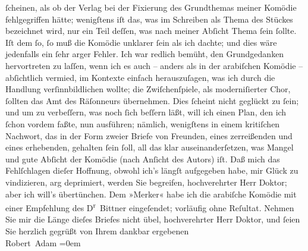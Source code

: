 \begin{ledgroupsized}[t]{13cm}
                    ſcheinen, als ob der Verlag bei der Fixierung des Grundthemas meiner Komödie
                    fehlgegriffen hätte; wenigſtens iſt das, was im Schreiben als Thema des Stückes
                    bezeichnet wird, nur ein Teil deſſen, was nach meiner Abſicht Thema ſein ſollte.
                    Iſt dem ſo, ſo muß die Komödie unklarer ſein als ich dachte; und dies wäre
                    jedenfalls ein ſehr arger Fehler. Ich war redlich bemüht, den Grundgedanken
                    hervortreten zu laſſen, {\pb}wenn ich es auch –
                    anders als in der arabiſchen
                        Komödie – abſichtlich vermied, im Kontexte einfach herauszuſagen, was
                    ich durch die Handlung verſinnbildlichen wollte; die Zwiſchenſpiele, als
                    moderniſierter Chor, ſollten das Amt des Räſonneurs übernehmen.\pend
           \pstart
           Dies ſcheint nicht geglückt zu ſein; und um zu verbeſſern, was noch ſich beſſern
                    läßt, will ich einen Plan, den ich ſchon vordem faßte, nun ausführen; nämlich,
                    wenigſtens in einem kritiſchen Nachwort, das in der Form zweier Briefe von
                    Freunden, eines zerreißenden und eines erhebenden, {\pb}gehalten ſein ſoll, all das klar
                    auseinanderſetzen, was Mangel und gute Abſicht der Komödie (nach Anſicht des
                    Autors) iſt.\pend
           \pstart
           Daß mich das Fehlſchlagen dieſer Hoffnung, obwohl ich’s längſt aufgegeben habe,
                    mir Glück zu vindizieren, arg deprimiert, werden Sie begreifen, hochverehrter
                    Herr Doktor; aber ich will’s übertünchen.\pend
           \pstart
           Dem »Merker« habe ich die arabiſche Komödie mit einer Empfehlung des D\textsuperscript{r} Bittner
                    eingeſendet; vorläufig ohne Reſultat.\pend
           \pstart
           Nehmen Sie mir die Länge dieſes Briefes nicht übel, hochverehrter Herr Doktor,
                    und ſeien Sie herzlich gegrüßt von Ihrem\pend
           \pstart
           dankbar ergebenen{\\[\baselineskip]}\spacefill\mbox{Robert Adam}\pend
           \leftskip=0em{}
         
         \endnumbering{}\end{ledgroupsized}  \newcommand{\dateiname}{L02002}\newcommand{\titel}{Robert Adam an Arthur Schnitzler, 3. 2. 1911}\newcommand{\editorInnen}{Martin Anton Müller und Gerd-Hermann Susen}
      